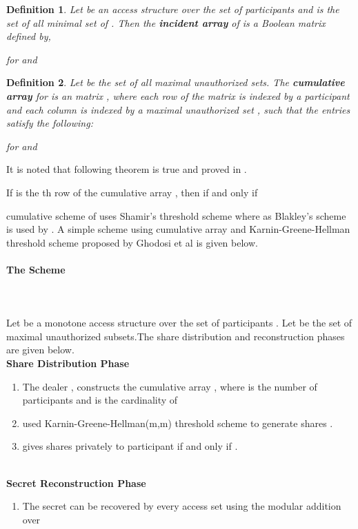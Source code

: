 \documentclass{llncs}
\newtheorem{defn}{Definition}
\begin{document}
    \begin{defn}
      Let  be an access structure over the set of participants  and     is the set of all minimal set of . Then the \textbf{incident array} of  is a  Boolean matrix  defined by,
      
 for  and 
 \end{defn}
 \begin{defn}
Let  be the set of all maximal unauthorized sets. The \textbf{cumulative array}  for  is an  matrix , where each row of the matrix is indexed by a participant  and each column is indexed by a maximal unauthorized set , such that the entries  satisfy the following:
       
         for  and 
 \end{defn} 
      It is noted that following theorem is true and proved in \cite{ghodosi1998construction}.
 \begin{theorem}
      If  is the th row of the cumulative array  , then  if and only if 
 \end{theorem}
 
 cumulative scheme of \cite{ito1989secret} uses Shamir's threshold \cite{shamir1979} scheme where as Blakley's scheme is used by \cite{jackson1993cumulative}. A simple scheme using cumulative array and Karnin-Greene-Hellman threshold scheme \cite{karnin1983} proposed by Ghodosi et al \cite{ghodosi1998construction} is given below.
      \paragraph{\textbf{The Scheme}} \ \\ \\
      Let  be a monotone access structure over the set of participants . Let  be the set of maximal unauthorized subsets.The share distribution and reconstruction phases are given below.\\  
\textbf{Share Distribution Phase}
 \begin{enumerate}
    \item The dealer , constructs the  cumulative array ,   where  is the number of participants and  is the cardinality of 
      \item  used Karnin-Greene-Hellman(m,m) threshold scheme \cite{karnin1983} to generate  shares .
      \item  gives shares  privately to participant  if and only if .
\end{enumerate} \ \\ 
\textbf{Secret Reconstruction Phase}
\begin{enumerate}
     \item The secret can be recovered by every access set using the modular addition over 
\end{enumerate}
      
\end{document}
